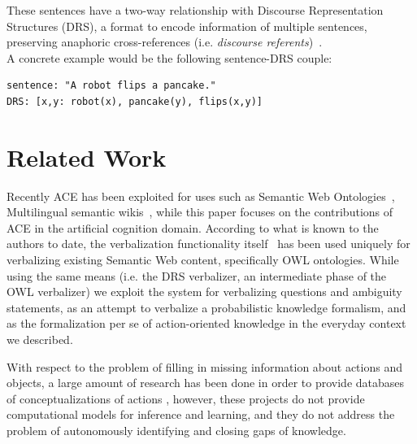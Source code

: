 \documentclass[oribibl]{llncs}
\begin{document}
These sentences have a two-way relationship with Discourse Representation 
Structures (DRS), a format to encode information of multiple sentences, 
preserving anaphoric cross-references (i.e. \textit{discourse referents})~\cite{kamp1993discourse}.\\
A concrete example would be the following sentence-DRS couple: 
{\small \begin{verbatim}
sentence: "A robot flips a pancake." 
DRS: [x,y: robot(x), pancake(y), flips(x,y)]
\end{verbatim}
}

\section{Related Work} Recently ACE has been exploited for uses such 
as Semantic Web Ontologies~\cite{kaljurand:phd}, Multilingual 
semantic wikis~\cite{kuhnkaljurandsemantic}, while this paper 
focuses on the contributions of ACE in the artificial cognition 
domain. According to what is known to the authors to date, the 
verbalization functionality itself~\cite{kaljurand:phd} has been 
used uniquely for verbalizing existing Semantic Web content, 
specifically OWL ontologies. While using the same means (i.e. the 
DRS verbalizer, an intermediate phase of the OWL verbalizer) we 
exploit the system for verbalizing questions and ambiguity statements, 
as an attempt to verbalize a probabilistic knowledge formalism, and 
as the formalization per se of action-oriented knowledge in the 
everyday context we described.

With respect to the problem of filling in missing information about 
actions and objects, a large amount of research has been done in 
order to provide databases of conceptualizations of actions \cite
{baker1998berkeley, schuler2005verbnet, kingsbury2002treebank}, 
however, these projects do not provide computational models for 
inference and learning, and they do not address the problem of autonomously identifying and closing
gaps of knowledge. 
\end{document}
